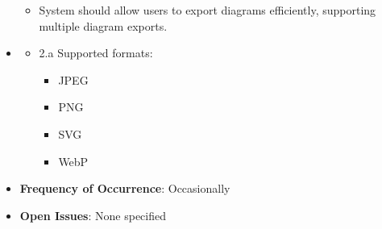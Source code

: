\documentclass[12pt]{article}
\begin{document}
\begin{itemize}
\begin{itemize}
            \item System should allow users to export diagrams efficiently, supporting multiple diagram exports.
        \end{itemize}
        \item {}
        \begin{itemize}
            \item 2.a Supported formats:
            \begin{itemize}
                \item JPEG
                \item PNG
                \item SVG
                \item WebP
            \end{itemize}
        \end{itemize}
        \item \textbf{Frequency of Occurrence}: Occasionally
        \item \textbf{Open Issues}: None specified
    \end{itemize}
\end{document}
